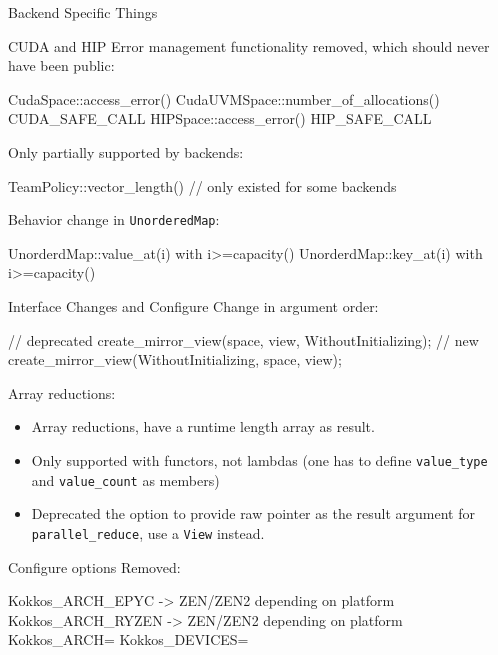\begin{frame}[fragile]{Backend Specific Things}

CUDA and HIP Error management functionality removed, which should never have been public:
\begin{code}
    CudaSpace::access_error()
    CudaUVMSpace::number_of_allocations()
    CUDA_SAFE_CALL
    HIPSpace::access_error()
    HIP_SAFE_CALL
\end{code}

Only partially supported by backends:
\begin{code}
    TeamPolicy::vector_length() // only existed for some backends
\end{code}

Behavior change in \texttt{UnorderedMap}:
\begin{code}
    UnorderdMap::value_at(i) with i>=capacity()
    UnorderdMap::key_at(i) with i>=capacity()
\end{code}
\end{frame}


\begin{frame}[fragile]{Interface Changes and Configure}
Change in argument order:
\begin{code}
    // deprecated
    create_mirror_view(space, view, WithoutInitializing);
    // new
    create_mirror_view(WithoutInitializing, space, view);
\end{code}

Array reductions:
\begin{itemize}
  \item Array reductions, have a runtime length array as result.
  \item Only supported with functors, not lambdas (one has to define \texttt{value\_type} and \texttt{value\_count} as members)
  \item Deprecated the option to provide raw pointer as the result argument for \texttt{parallel\_reduce}, use a \texttt{View} instead.
\end{itemize}

Configure options Removed:
\begin{code}
	Kokkos_ARCH_EPYC -> ZEN/ZEN2 depending on platform
	Kokkos_ARCH_RYZEN -> ZEN/ZEN2 depending on platform
	Kokkos_ARCH=
	Kokkos_DEVICES=
\end{code}
\end{frame}
